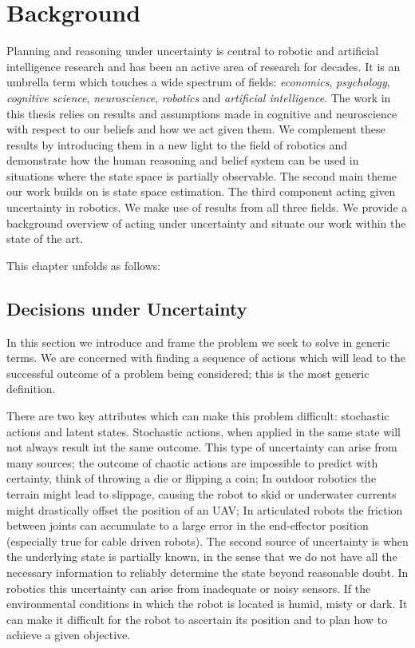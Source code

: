 \chapter{Background}

Planning and reasoning under uncertainty is central to robotic and artificial intelligence research and has 
been an active area of research for decades. It is an umbrella term which touches a
wide spectrum of fields: \textit{economics}, \textit{psychology}, \textit{cognitive science}, \textit{neuroscience},
\textit{robotics} and \textit{artificial intelligence}. The work in this thesis relies on results  and assumptions 
made in cognitive and neuroscience with respect to our beliefs and how we act given them. We complement 
these results by introducing them in a new light to the field of robotics and demonstrate how the human reasoning and belief system 
can be used in situations where the state space is partially observable. The second main theme our work builds on is 
state space estimation. The third component acting given uncertainty in robotics. We make use of results from all 
three fields. We provide a background overview of acting under uncertainty and situate our work within the state of the 
art.

This chapter unfolds as follows: 



\section{Decisions under Uncertainty}

In this section we introduce and frame the problem we seek to solve in generic 
terms. We are concerned with finding a sequence of actions which will lead to the successful 
outcome of a problem being considered; this is the most generic definition. 

There are two key attributes which can make this problem difficult: stochastic actions and latent states. Stochastic 
actions, when applied in the same state will not always result int the same outcome. This type of uncertainty 
can arise from many sources; the outcome of chaotic actions are impossible to predict with certainty, 
think of throwing a die or flipping a coin; In outdoor robotics the terrain might lead to slippage, causing 
the robot to skid or underwater currents might drastically offset the position of an UAV; In articulated 
robots the friction between joints can accumulate to a large error in the end-effector position (especially true 
for cable driven robots). 
The second source of uncertainty is when the underlying state is partially known, in the sense that we do not 
have all the necessary information to reliably determine the state beyond reasonable doubt. In robotics this 
uncertainty can arise from inadequate or noisy sensors. If the environmental conditions in which the robot 
is located is humid, misty or dark. It can make it difficult for the robot to ascertain its position and 
to plan how to achieve a given objective.

